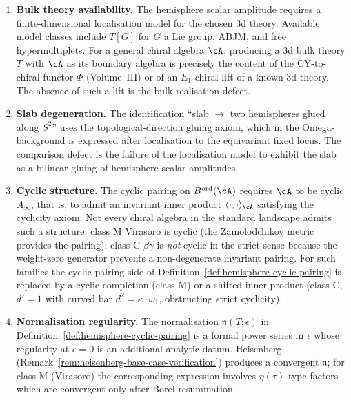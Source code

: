 \begin{remark}
\label{rem:hemisphere-cyclic-obstructions}
\leavevmode
\begin{enumerate}[leftmargin=2em,label=(\roman*)]
\item \textbf{Bulk theory availability.} The hemisphere scalar
amplitude requires a finite-dimensional localisation
model for the chosen $3$d theory. Available model classes include
$T[G]$ for $G$ a Lie group, ABJM, and free hypermultiplets. For a general chiral
algebra $\cA$, producing a $3$d bulk theory $T$ with $\cA$ as its
boundary algebra is precisely the content of the CY-to-chiral
functor $\Phi$ (Volume~III) or of an $E_1$-chiral lift
of a known $3$d theory. The absence of such a lift is the
bulk-realisation defect.
\item \textbf{Slab degeneration.} The identification
``slab $\to$ two hemispheres glued along $S^2$'' uses the
topological-direction gluing axiom, which in the
Omega-background is expressed after localisation to the
equivariant fixed locus. The comparison defect is the failure of
the localisation model to exhibit the slab as a bilinear gluing of
hemisphere scalar amplitudes.
\item \textbf{Cyclic structure.} The cyclic pairing on
$B^{\mathrm{ord}}(\cA)$ requires $\cA$ to be cyclic $A_\infty$,
that is, to admit an invariant inner product
$\langle\cdot,\cdot\rangle_\cA$ satisfying the cyclicity axiom.
Not every chiral algebra in the standard landscape admits such a
structure: class M Virasoro is cyclic (the Zamolodchikov metric
provides the pairing); class C $\beta\gamma$ is \emph{not}
cyclic in the strict sense because the weight-zero generator
prevents a non-degenerate invariant pairing. For such families
the cyclic pairing side of
Definition~\ref{def:hemisphere-cyclic-pairing} is replaced
by a cyclic completion (class M) or a shifted inner product
(class C, $d'=1$ with curved bar $d^2=\kappa\cdot\omega_1$,
obstructing strict cyclicity).
\item \textbf{Normalisation regularity.} The normalisation
$\mathfrak n(T;\epsilon)$ in
Definition~\ref{def:hemisphere-cyclic-pairing} is a formal
power series in $\epsilon$ whose regularity at $\epsilon=0$ is
an additional analytic datum. Heisenberg
(Remark~\ref{rem:heisenberg-base-case-verification}) produces a
convergent $\mathfrak n$; for class M (Virasoro)
the corresponding expression involves $\eta(\tau)$-type factors which
are convergent only after Borel resummation.
\end{enumerate}
\end{remark}

